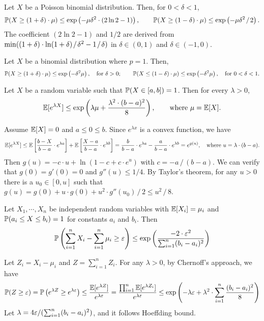 \documentclass[main.tex]{subfiles}
\begin{document}
\begin{corollary}
	Let $X$ be a Poisson binomial distribution. Then, for $0<\delta<1$, 
	\[\mathbb{P}(X\ge(1+\delta)\cdot\mu)\le \exp\left(-\mu\delta^2\cdot (2\ln 2-1)\right),\qquad\mathbb{P}(X\ge(1-\delta)\cdot\mu)\le \exp\left(-\mu\delta^2\;\!/\;\! 2\right).\]
	The coefficient $(2\ln 2-1)$ and $1/2$ are derived from $\min((1+\delta)\cdot \ln(1+\delta)\;\!/\;\!\delta^2 - 1\;\!/\;\! \delta)$ in $\delta\in(0,1)$ and $\delta\in(-1,0)$.
\end{corollary}

\begin{theorem}
	Let $X$ be a binomial distribution where $p=1$. Then,
	\[
		\mathbb{P}(X\ge(1+\delta)\cdot\mu)\le \exp\left(-\delta^2\mu\right),\quad\text{for }\delta>0;\qquad
		\mathbb{P}(X\le(1-\delta)\cdot\mu)\le \exp\left(-\delta^2\mu\right),\quad\text{for }0<\delta<1.
	\]
\end{theorem}

\begin{lemma}
	Let $X$ be a random variable such that $\mathbb{P}(X\in[a,b])=1$. Then for every $\lambda>0$,
	\[\mathbb{E}[e^{\lambda X}]\le\exp\left(\lambda\mu+\frac{\lambda^2\cdot(b-a)^2}{8}\right),\qquad \text{where }\mu=\mathbb{E}[X].\]
\end{lemma}

\begin{pf}
	Assume $\mathbb{E}[X]=0$ and $a\le 0\le b$. Since $e^{\lambda x}$ is a convex function, we have
	\[\mathbb{E}[e^{\lambda X}]\le\mathbb{E}\left[\frac{b-X}{b-a}\cdot e^{\lambda a}\right] + \mathbb{E}\left[\frac{X-a}{b-a}\cdot e^{\lambda b}\right] = \frac{b}{b-a}\cdot e^{\lambda a} - \frac{a}{b-a}\cdot e^{\lambda b} = e^{g(u)},\quad\text{where }u=\lambda\cdot(b-a).\]
	Then $g(u)=-c\cdot u+\ln(1-c+c\cdot e^u)$ with $c=-a\,/\,(b-a)$. We can verify that $g(0)=g'(0)=0$ and $g''(u)\le 1/4$. By Taylor's theorem, for any $u > 0$ there is a $u_0\in[0,u]$ such that $g(u)=g(0)+u\cdot g(0)+u^2\cdot g''(u_0)\,/\,2\le u^2\,/\,8$.
\end{pf}

\begin{theorem}
	Let $X_1,\cdots,X_n$ be independent random variables with $\mathbb{E}[X_i]=\mu_i$ and $\mathbb{P}(a_i\le X\le b_i)=1$ for constants $a_i$ and $b_i$. Then
	\[
		\mathbb{P}\left(\sum_{i=1}^{n}X_i-\sum_{i=1}^{n}\mu_i\ge\varepsilon\right)\le \exp\left(\frac{-2\cdot\varepsilon^2}{\sum_{i=1}^{n}(b_i-a_i)^2}\right)
	\]
\end{theorem}

\begin{pf}
	Let $Z_i=X_i-\mu_i$ and $Z=\sum_{i=1}^{n}Z_i$. For any $\lambda>0$, by Chernoff's approach, we have
	\[
		\mathbb{P}(Z\ge\varepsilon)=\mathbb{P}\left(e^{\lambda Z}\ge e^{\lambda\varepsilon}\right) \le \frac{\mathbb{E}[e^{\lambda Z}]}{e^{\lambda \varepsilon}}=\frac{\prod_{i=1}^{n}\mathbb{E}[e^{\lambda Z_i}]}{e^{\lambda \varepsilon}}\le\exp\left(-\lambda\varepsilon+\lambda^2\cdot\sum_{i=1}^{n}\frac{(b_i-a_i)^2}{8}\right)
	\]
	Let $\lambda = 4\varepsilon / (\sum_{i=1}^{n}(b_i-a_i)^2)$, and it follows Hoeffding bound.
\end{pf}
\end{document}
